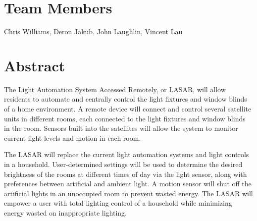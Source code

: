 \hypertarget{index_team_mem}{}\section{Team Members}\label{index_team_mem}
Chris Williams, Deron Jakub, John Laughlin, Vincent Lau\hypertarget{index_abstract}{}\section{Abstract}\label{index_abstract}
The Light Automation System Accessed Remotely, or L\-A\-S\-A\-R, will allow residents to automate and centrally control the light fixtures and window blinds of a home environment. A remote device will connect and control several satellite units in different rooms, each connected to the light fixtures and window blinds in the room. Sensors built into the satellites will allow the system to monitor current light levels and motion in each room.

The L\-A\-S\-A\-R will replace the current light automation systems and light controls in a household. User-\/determined settings will be used to determine the desired brightness of the rooms at different times of day via the light sensor, along with preferences between artificial and ambient light. A motion sensor will shut off the artificial lights in an unoccupied room to prevent wasted energy. The L\-A\-S\-A\-R will empower a user with total lighting control of a household while minimizing energy wasted on inappropriate lighting. 